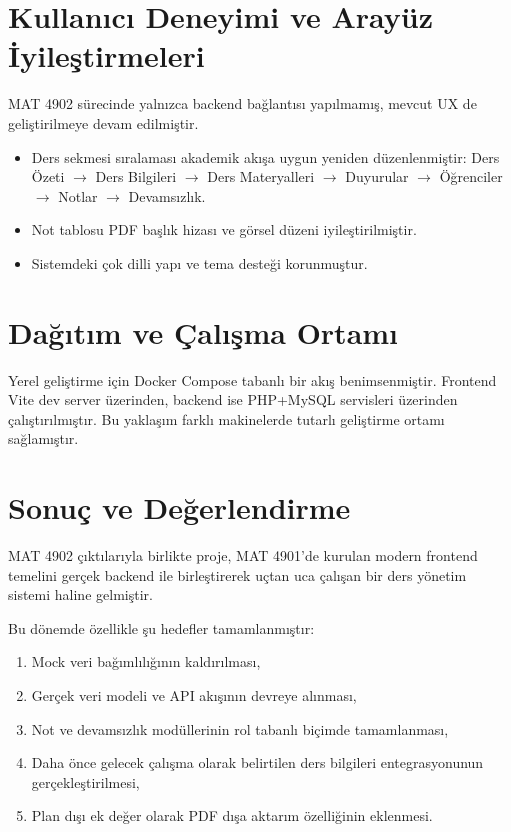 \documentclass[12pt,a4paper]{article}
\begin{document}
\section{Kullanıcı Deneyimi ve Arayüz İyileştirmeleri}
MAT 4902 sürecinde yalnızca backend bağlantısı yapılmamış, mevcut UX de geliştirilmeye devam edilmiştir.

\begin{itemize}[leftmargin=*]
    \item Ders sekmesi sıralaması akademik akışa uygun yeniden düzenlenmiştir:
    Ders Özeti $\rightarrow$ Ders Bilgileri $\rightarrow$ Ders Materyalleri $\rightarrow$ Duyurular $\rightarrow$ Öğrenciler $\rightarrow$ Notlar $\rightarrow$ Devamsızlık.

    \item Not tablosu PDF başlık hizası ve görsel düzeni iyileştirilmiştir.

    \item Sistemdeki çok dilli yapı ve tema desteği korunmuştur.
\end{itemize}

\section{Dağıtım ve Çalışma Ortamı}
Yerel geliştirme için Docker Compose tabanlı bir akış benimsenmiştir. Frontend Vite dev server üzerinden, backend ise PHP+MySQL servisleri üzerinden çalıştırılmıştır. Bu yaklaşım farklı makinelerde tutarlı geliştirme ortamı sağlamıştır.

\section{Sonuç ve Değerlendirme}
MAT 4902 çıktılarıyla birlikte proje, MAT 4901'de kurulan modern frontend temelini gerçek backend ile birleştirerek uçtan uca çalışan bir ders yönetim sistemi haline gelmiştir.

Bu dönemde özellikle şu hedefler tamamlanmıştır:

\begin{enumerate}[leftmargin=*]
    \item Mock veri bağımlılığının kaldırılması,
    \item Gerçek veri modeli ve API akışının devreye alınması,
    \item Not ve devamsızlık modüllerinin rol tabanlı biçimde tamamlanması,
    \item Daha önce gelecek çalışma olarak belirtilen ders bilgileri entegrasyonunun gerçekleştirilmesi,
    \item Plan dışı ek değer olarak PDF dışa aktarım özelliğinin eklenmesi.
\end{enumerate}
\end{document}
